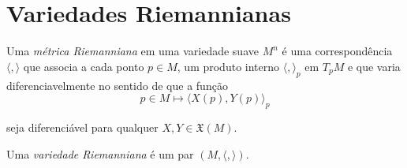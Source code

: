 \section{Variedades Riemannianas}

\begin{defi}
	Uma \emph{métrica Riemanniana} em uma variedade suave $M^n$ é uma correspondência $\langle , \rangle$ que associa a cada ponto $p \in M$, um produto interno $\langle , \rangle_p$ em $T_p M$ e que varia diferenciavelmente no sentido de que a função
	\begin{equation*}
		p \in M \mapsto \langle X(p), Y(p) \rangle_p
	\end{equation*}
	
	seja diferenciável para qualquer $X,Y \in \mathfrak{X}(M)$.
\end{defi}

\begin{defi}
	Uma \emph{variedade Riemanniana} é um par $(M, \langle , \rangle)$.
\end{defi}

